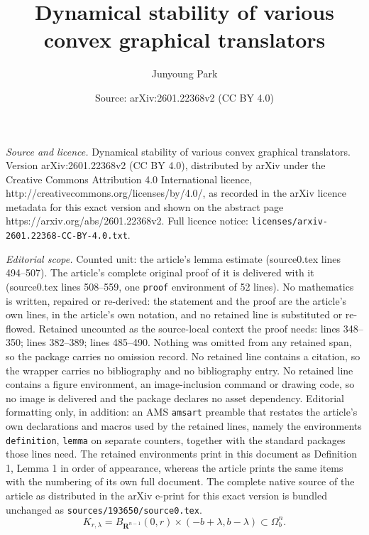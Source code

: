 \documentclass[10pt,a4paper]{amsart}
\title{Dynamical stability of various convex graphical translators}
\author{Junyoung Park}
\date{Source: arXiv:2601.22368v2 (CC BY 4.0)}
\begin{document}
\maketitle

\noindent\emph{Source and licence.} Dynamical stability of various convex graphical translators. Version arXiv:2601.22368v2 (CC BY 4.0), distributed by arXiv under the Creative Commons Attribution 4.0 International licence, http://creativecommons.org/licenses/by/4.0/, as recorded in the arXiv licence metadata for this exact version and shown on the abstract page https://arxiv.org/abs/2601.22368v2. Full licence notice: \texttt{licenses/arxiv-2601.22368-CC-BY-4.0.txt}.\par\smallskip

\noindent\textit{Editorial scope.} Counted unit: the article's lemma estimate (source0.tex lines 494--507). The article's complete original proof of it is delivered with it (source0.tex lines 508--559, one \texttt{proof} environment of 52 lines). No mathematics is written, repaired or re-derived: the statement and the proof are the article's own lines, in the article's own notation, and no retained line is substituted or re-flowed.  Retained uncounted as the source-local context the proof needs: lines 348--350; lines 382--389; lines 485--490.  Nothing was omitted from any retained span, so the package carries no omission record.  No retained line contains a citation, so the wrapper carries no bibliography and no bibliography entry.  No retained line contains a figure environment, an image-inclusion command or drawing code, so no image is delivered and the package declares no asset dependency.  Editorial formatting only, in addition: an AMS \texttt{amsart} preamble that restates the article's own declarations and macros used by the retained lines, namely the environments \texttt{definition}, \texttt{lemma} on separate counters, together with the standard packages those lines need.  The retained environments print in this document as Definition 1, Lemma 1 in order of appearance, whereas the article prints the same items with the numbering of its own full document.  The complete native source of the article as distributed in the arXiv e-print for this exact version is bundled unchanged as \texttt{sources/193650/source0.tex}.
    \begin{equation}\label{definition of domain}
    K_{r, \lambda} = B_{\mathbf{R}^{n-1}}(0, r) \times (-b + \lambda, b - \lambda) \subset \Omega^n_b.
    \end{equation}
\end{document}
